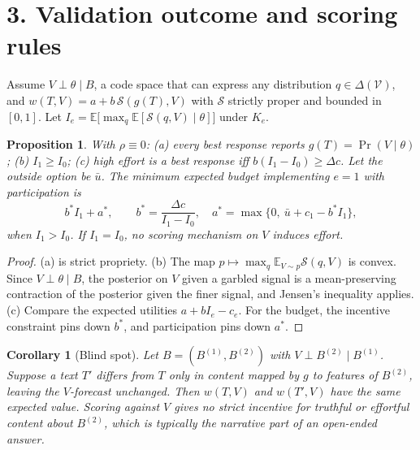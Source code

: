 \documentclass[11pt]{article}
\newtheorem{proposition}[theorem]{Proposition}
\newtheorem{corollary}[theorem]{Corollary}
\theoremstyle{definition}
\begin{document}
\section*{3. Validation outcome and scoring rules}
Assume $V\perp\theta\mid B$, a code space that can express any distribution $q\in\Delta(\mathcal V)$, and
$w(T,V)=a+b\,\mathcal S(g(T),V)$ with $\mathcal S$ strictly proper and bounded in $[0,1]$. Let
$I_e=\mathbb E\bigl[\max_q\mathbb E[\mathcal S(q,V)\mid\theta]\bigr]$ under $K_e$.
\begin{proposition}\label{prop:score}
With $\rho\equiv0$: (a) every best response reports $g(T)=\Pr(V\mid\theta)$; (b) $I_1\ge I_0$; (c) high effort is a best
response iff $b(I_1-I_0)\ge\Delta c$. Let the outside option be $\bar u$. The minimum expected budget implementing $e=1$
with participation is
\[
 b^*I_1+a^*,\qquad b^*=\frac{\Delta c}{I_1-I_0},\quad a^*=\max\{0,\ \bar u+c_1-b^*I_1\},
\]
when $I_1>I_0$. If $I_1=I_0$, no scoring mechanism on $V$ induces effort.
\end{proposition}
\begin{proof}
(a) is strict propriety. (b) The map $p\mapsto\max_q\mathbb E_{V\sim p}\mathcal S(q,V)$ is convex. Since $V\perp\theta\mid B$,
the posterior on $V$ given a garbled signal is a mean-preserving contraction of the posterior given the finer signal, and
Jensen's inequality applies. (c) Compare the expected utilities $a+bI_e-c_e$. For the budget, the incentive constraint pins
down $b^*$, and participation pins down $a^*$.
\end{proof}
\begin{corollary}[Blind spot]
Let $B=(B^{(1)},B^{(2)})$ with $V\perp B^{(2)}\mid B^{(1)}$. Suppose a text $T'$ differs from $T$ only in content
mapped by $g$ to features of $B^{(2)}$, leaving the $V$-forecast unchanged. Then $w(T,V)$ and $w(T',V)$ have the same
expected value. Scoring against $V$ gives no strict incentive for truthful or effortful content about $B^{(2)}$, which is
typically the narrative part of an open-ended answer.
\end{corollary}
\end{document}
